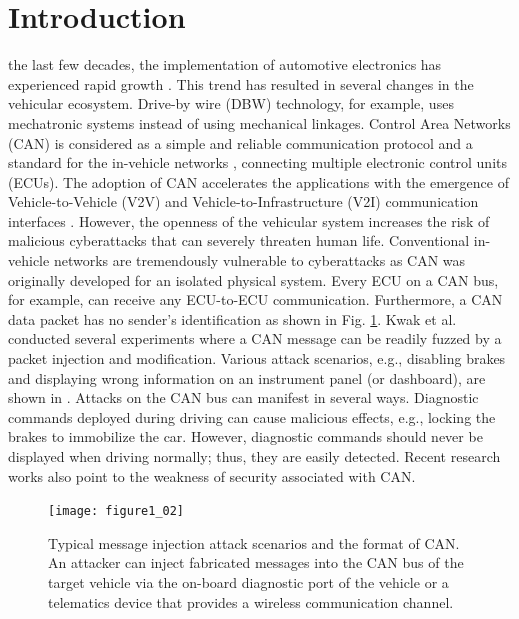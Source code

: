 \documentclass[lettersize,journal]{IEEEtran}
\begin{document}
\section{Introduction}
 the last few decades, the implementation of automotive electronics has experienced rapid growth \cite{1}. This trend has resulted in several changes in the vehicular ecosystem. Drive-by wire (DBW) technology, for example, uses mechatronic systems instead of using mechanical linkages. Control Area Networks (CAN) is considered as a simple and reliable communication protocol and a standard for the in-vehicle networks \cite{2}, connecting multiple electronic control units (ECUs). The adoption of CAN accelerates the applications with the emergence of Vehicle-to-Vehicle (V2V) and Vehicle-to-Infrastructure (V2I) communication interfaces \cite{3}. However, the openness of the vehicular system increases the risk of malicious cyberattacks that can severely threaten human life. Conventional in-vehicle networks are tremendously vulnerable to cyberattacks as CAN was originally developed for an isolated physical system. Every ECU on a CAN bus, for example, can receive any ECU-to-ECU communication. Furthermore, a CAN data packet has no sender’s identification as shown in Fig. \ref{fig_1}. Kwak et al. \cite{KWAK2021114066} conducted several experiments where a CAN message can be readily fuzzed by a packet injection and modification. Various attack scenarios, e.g., disabling brakes and displaying wrong information on an instrument panel (or dashboard), are shown in \cite{5,6}. Attacks on the CAN bus can manifest in several ways. Diagnostic commands deployed during driving can cause malicious effects, e.g., locking the brakes to immobilize the car. However, diagnostic commands should never be displayed when driving normally; thus, they are easily detected. Recent research works \cite{9439954, 9322395} also point to the weakness of security associated with CAN.

\begin{figure}[!t]
\centering
\texttt{[image: figure1\_02]}
\caption{Typical message injection attack scenarios and the format of CAN. An attacker can inject fabricated messages into the CAN bus of the target vehicle via the on-board diagnostic port of the vehicle or a telematics device that provides a wireless communication channel.}
\label{fig_1}
\end{figure}
\end{document}
